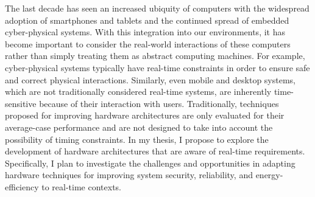 The last decade has seen an increased ubiquity of computers with the widespread
adoption of smartphones and tablets and the continued spread of embedded
cyber-physical systems. With this integration into our environments, it has
become important to consider the real-world interactions of these computers
rather than simply treating them as abstract computing machines. For example,
cyber-physical systems typically have real-time constraints in order to ensure
safe and correct physical interactions. Similarly, even mobile and desktop
systems, which are not traditionally considered real-time systems, are
inherently time-sensitive because of their interaction with users.
Traditionally, techniques proposed for improving
hardware architectures are only evaluated for their average-case
performance and are not designed to take into account the possibility of timing
constraints. In my thesis, I propose to explore the development of hardware
architectures that are aware of real-time requirements. Specifically, I plan to
investigate the challenges and opportunities in adapting hardware techniques
for improving system security, reliability, and energy-efficiency to real-time
contexts.


